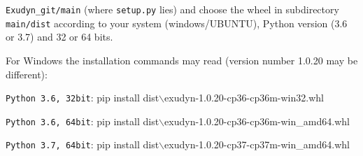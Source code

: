 \noindent {} \texttt{Exudyn\_git/main} (where \texttt{setup.py} lies) and choose the wheel in subdirectory \texttt{main/dist} according to your system (windows/UBUNTU), Python version (3.6 or 3.7) and 32 or 64 bits.

For Windows the installation commands may read (version number 1.0.20 may be different):
\bi
  \item \texttt{Python 3.6, 32bit}: pip install dist$\backslash$exudyn-1.0.20-cp36-cp36m-win32.whl
  \item \texttt{Python 3.6, 64bit}: pip install dist$\backslash$exudyn-1.0.20-cp36-cp36m-win\_amd64.whl
  \item \texttt{Python 3.7, 64bit}: pip install dist$\backslash$exudyn-1.0.20-cp37-cp37m-win\_amd64.whl
\ei

%


